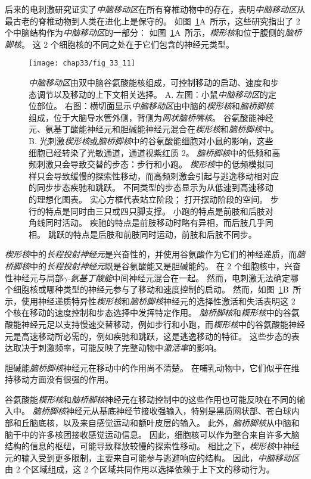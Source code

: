 后来的电刺激研究证实了\textit{中脑移动区}在所有脊椎动物中的存在，表明\textit{中脑移动区}从最古老的脊椎动物到人类在进化上是保守的。
如图~\ref{fig:33_11}A~所示，这些研究指出了 2 个中脑结构作为\textit{中脑移动区}的一部分：
如图~\ref{fig:33_11}A~所示，\textit{楔形核}和位于腹侧的\textit{脑桥脚核}。
这 2 个细胞核的不同之处在于它们包含的神经元类型。


\begin{figure}[htbp]
	\centering
	\texttt{[image: chap33/fig\_33\_11]}
	\caption{\textit{中脑移动区}由双中脑谷氨酸能核组成，可控制移动的启动、速度和步态调节以及移动的上下文相关选择。
		A. 左图：小鼠\textit{中脑移动区}的定位部位。
		右图：横切面显示\textit{中脑移动区}由中脑的\textit{楔形核}和\textit{脑桥脚核}组成，位于大脑导水管外侧，背侧为\textit{网状脑桥嘴核}。
		谷氨酸能神经元、氨基丁酸能神经元和胆碱能神经元混合在\textit{楔形核}和\textit{脑桥脚核}中。
		B. 光刺激\textit{楔形核}或\textit{脑桥脚核}中的谷氨酸能细胞对小鼠的影响，这些细胞已经转染了光敏通道，通道视紫红质 2。
		\textit{脑桥脚核}中的低频和高频刺激只会导致交替的步态：步行和小跑。
		\textit{楔形核}中的低频模拟同样只会导致缓慢的探索性移动，而高频刺激会引起与逃逸移动相对应的同步步态疾驰和跳跃。
		不同类型的步态显示为从低速到高速移动的理想化图表。
		实心方框代表站立阶段；
		打开摆动阶段的空间。
		步行的特点是同时由三只或四只脚支撑。
		小跑的特点是前肢和后肢对角线同时活动。
		疾驰的特点是前肢移动时略有异相，而后肢几乎同相。
		跳跃的特点是后肢和前肢同时运动，前肢和后肢不同步\cite{caggiano2018midbrain}。}
	\label{fig:33_11}
\end{figure}


\textit{楔形核}中的\textit{长程投射神经元}是兴奋性的，并使用谷氨酸作为它们的神经递质，而\textit{脑桥脚核}中的\textit{长程投射神经元}既是谷氨酸能又是胆碱能的。
在 2 个细胞核中，兴奋性神经元与局部\textit{$\gamma$-氨基丁酸能}中间神经元混合在一起。
然而，电刺激无法确定哪个细胞核或哪种类型的神经元参与了移动和速度控制的启动。
然而，如图~\ref{fig:33_11}B~所示，使用神经递质特异性\textit{楔形核}和\textit{脑桥脚核}神经元的选择性激活和失活表明这 2 个核在移动的速度控制和步态选择中发挥特定作用。
\textit{脑桥脚核}和\textit{楔形核}中的谷氨酸能神经元足以支持慢速交替移动，例如步行和小跑，而\textit{楔形核}中的谷氨酸能神经元是高速移动所必需的，例如疾驰和跳跃，这是逃逸移动的特征。
这些步态的表达取决于刺激频率，可能反映了完整动物中\textit{激活率}的影响。


胆碱能\textit{脑桥脚核}神经元在移动中的作用尚不清楚。
在哺乳动物中，它们似乎在维持移动方面没有很强的作用。


谷氨酸能\textit{楔形核}和\textit{脑桥脚核}神经元在移动控制中的这些作用也可能反映在不同的输入中。
\textit{脑桥脚核}神经元从基底神经节接收强输入，特别是黑质网状部、苍白球内部和丘脑底核，以及来自感觉运动和额叶皮层的输入。
此外，\textit{脑桥脚核}从中脑和脑干中的许多核团接收感觉运动信息。
因此，细胞核可以作为整合来自许多大脑结构的信息的枢纽，可能导致释放较慢的探索性移动。
相比之下，\textit{楔形核}中神经元的输入受到更多限制，主要来自可能参与逃避响应的结构。
因此，\textit{中脑移动区}由 2 个区域组成，这 2 个区域共同作用以选择依赖于上下文的移动行为。


